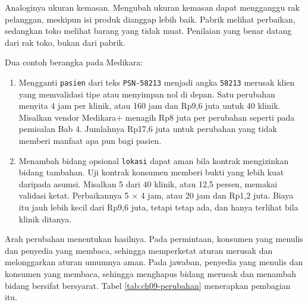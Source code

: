 Analoginya ukuran kemasan. Mengubah ukuran kemasan dapat mengganggu rak pelanggan, meskipun isi produk dianggap lebih baik. Pabrik melihat perbaikan, sedangkan toko
melihat barang yang tidak muat. Penilaian yang benar datang dari rak toko, bukan dari pabrik.

Dua contoh berangka pada Medikara:
\begin{enumerate}
  \item Mengganti \texttt{pasien} dari teks \texttt{PSN-58213} menjadi angka \texttt{58213} merusak klien yang memvalidasi tipe atau menyimpan nol di depan. Satu perubahan
        menyita 4 jam per klinik, atau 160 jam dan Rp9,6 juta untuk 40 klinik. Misalkan vendor Medikara+ menagih Rp8 juta per perubahan seperti pada pemisalan Bab 4.
        Jumlahnya Rp17,6 juta untuk perubahan yang tidak memberi manfaat apa pun bagi pasien.
  \item Menambah bidang opsional \texttt{lokasi} dapat aman bila kontrak mengizinkan bidang tambahan. Uji kontrak konsumen memberi bukti yang lebih kuat daripada asumsi.
        Misalkan 5 dari 40 klinik, atau 12,5 persen, memakai validasi ketat. Perbaikannya 5 $\times$ 4 jam, atau 20 jam dan Rp1,2 juta. Biaya itu jauh lebih kecil dari Rp9,6 juta,
        tetapi tetap ada, dan hanya terlihat bila klinik ditanya.
\end{enumerate}

Arah perubahan menentukan hasilnya. Pada permintaan, konsumen yang menulis dan penyedia yang membaca, sehingga memperketat aturan merusak dan melonggarkan aturan umumnya aman.
Pada jawaban, penyedia yang menulis dan konsumen yang membaca, sehingga menghapus bidang merusak dan menambah bidang bersifat bersyarat. Tabel \ref{tab:ch09-perubahan} menerapkan
pembagian itu.

